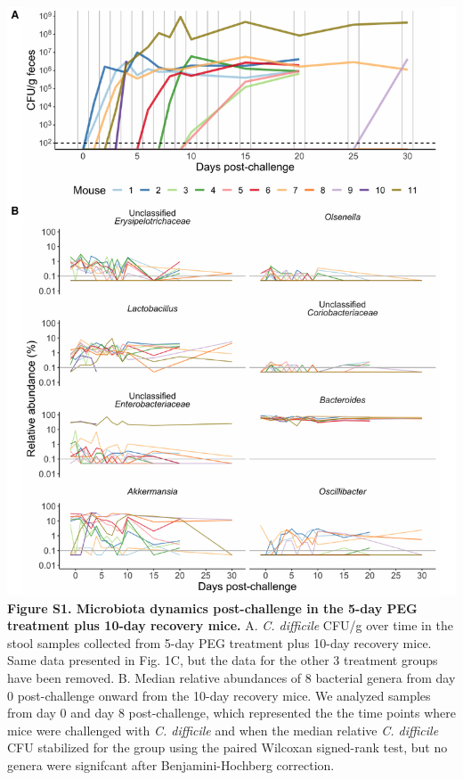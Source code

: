 \documentclass[
  11pt,
]{article}
\begin{document}
\includegraphics{figure_S1.pdf} \textbf{Figure S1. Microbiota dynamics
post-challenge in the 5-day PEG treatment plus 10-day recovery mice.} A.
\emph{C. difficile} CFU/g over time in the stool samples collected from
5-day PEG treatment plus 10-day recovery mice. Same data presented in
Fig. 1C, but the data for the other 3 treatment groups have been
removed. B. Median relative abundances of 8 bacterial genera from day 0
post-challenge onward from the 10-day recovery mice. We analyzed samples
from day 0 and day 8 post-challenge, which represented the the time
points where mice were challenged with \emph{C. difficile} and when the
median relative \emph{C. difficile} CFU stabilized for the group using
the paired Wilcoxan signed-rank test, but no genera were signifcant
after Benjamini-Hochberg correction. \newpage
\end{document}
